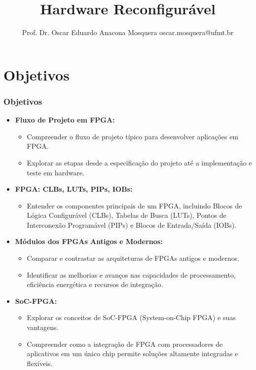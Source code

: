 \documentclass[aspectratio=169]{beamer}
\title[Minicurso FPGAs]{\huge Hardware Reconfigurável}
\author[Prof. Dr. Oscar Eduardo Anacona Mosquera]{Prof. Dr. Oscar Eduardo Anacona Mosquera \newline\newline 
\scriptsize{oscar.mosquera@ufmt.br}
}
\begin{document}
\begin{frame}[plain]
\titlepage
\end{frame}
\section{Objetivos}

\begin{frame}
	\frametitle{Objetivos}
	
	\begin{itemize}
		\item \textbf{Fluxo de Projeto em FPGA:}
		\begin{itemize}
			\item Compreender o fluxo de projeto típico para desenvolver aplicações em FPGA.
			\item Explorar as etapas desde a especificação do projeto até a implementação e teste em hardware.
		\end{itemize}
		
		\item \textbf{FPGA: CLBs, LUTs, PIPs, IOBs:}
		\begin{itemize}
			\item Entender os componentes principais de um FPGA, incluindo Blocos de Lógica Configurável (CLBs), Tabelas de Busca (LUTs), Pontos de Interconexão Programável (PIPs) e Blocos de Entrada/Saída (IOBs).
		\end{itemize}
		
		\item \textbf{Módulos dos FPGAs Antigos e Modernos:}
		\begin{itemize}
			\item Comparar e contrastar as arquiteturas de FPGAs antigos e modernos.
			\item Identificar as melhorias e avanços nas capacidades de processamento, eficiência energética e recursos de integração.
		\end{itemize}
		
		\item \textbf{SoC-FPGA:}
		\begin{itemize}
			\item Explorar os conceitos de SoC-FPGA (System-on-Chip FPGA) e suas vantagens.
			\item Compreender como a integração de FPGA com processadores de aplicativos em um único chip permite soluções altamente integradas e flexíveis.
		\end{itemize}
	\end{itemize}

\end{frame}
\end{document}
